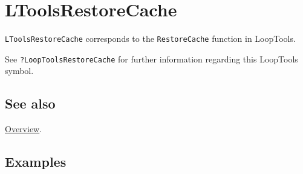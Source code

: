 \documentclass[../FeynHelpersManual.tex]{subfiles}
\begin{document}
\hypertarget{ltoolsrestorecache}{
\section{LToolsRestoreCache}\label{ltoolsrestorecache}}

\texttt{LToolsRestoreCache} corresponds to the \texttt{RestoreCache}
function in LoopTools.

See \texttt{?LoopTools\textasciigrave RestoreCache} for further
information regarding this LoopTools symbol.

\subsection{See also}

\hyperlink{toc}{Overview}.

\subsection{Examples}
\end{document}
